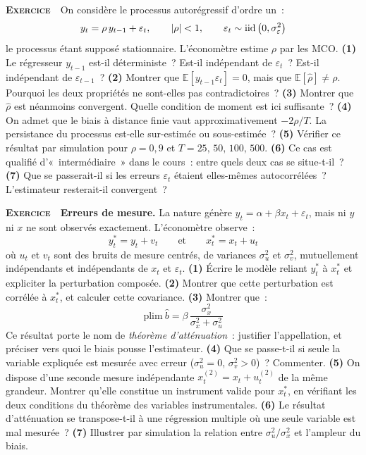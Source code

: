 \documentclass[10pt,a4paper,notitlepage]{article}
\newcounter{xnumber}
\newcommand{\exercice}{\refstepcounter{xnumber}\textsc{\textbf{Exercice}} \textbf{\thexnumber}\,\,}
\newcommand{\question}[1]{\textbf{(#1)}}
\begin{document}
\bigskip

\exercice\label{ex:ar1-biais} On considère le processus autorégressif d'ordre un~:
\[
  y_t = \rho\, y_{t-1} + \varepsilon_t, \qquad |\rho|<1,
  \qquad \varepsilon_t\sim\mathrm{iid}\left(0,\sigma_{\varepsilon}^2\right)
\]
le processus étant supposé stationnaire. L'économètre estime $\rho$ par les MCO.
\question{1} Le régresseur $y_{t-1}$ est-il déterministe~? Est-il indépendant
de $\varepsilon_t$~? Est-il indépendant de $\varepsilon_{t-1}$~? \question{2}
Montrer que $\mathbb E[y_{t-1}\varepsilon_t] = 0$, mais que
$\mathbb E[\hat\rho]\neq\rho$. Pourquoi les deux propriétés ne sont-elles pas
contradictoires~? \question{3} Montrer que $\hat\rho$ est néanmoins convergent.
Quelle condition de moment est ici suffisante~? \question{4} On admet que le
biais à distance finie vaut approximativement $-2\rho/T$. La persistance du
processus est-elle sur-estimée ou sous-estimée~? \question{5} Vérifier ce
résultat par simulation pour $\rho = 0{,}9$ et $T = 25,\,50,\,100,\,500$.
\question{6} Ce cas est qualifié d'«~intermédiaire~» dans le cours~: entre quels
deux cas se situe-t-il~? \question{7} Que se passerait-il si les erreurs
$\varepsilon_t$ étaient elles-mêmes autocorrélées~? L'estimateur resterait-il
convergent~?\newline

\bigskip

\exercice\label{ex:erreurs-mesure} \textbf{Erreurs de mesure.} La nature génère
$y_t = \alpha + \beta x_t + \varepsilon_t$, mais ni $y$ ni $x$ ne sont observés
exactement. L'économètre observe~:
\[
  y_t^{*} = y_t + v_t
  \qquad\text{et}\qquad
  x_t^{*} = x_t + u_t
\]
où $u_t$ et $v_t$ sont des bruits de mesure centrés, de variances $\sigma_u^2$
et $\sigma_v^2$, mutuellement indépendants et indépendants de $x_t$ et
$\varepsilon_t$. \question{1} Écrire le modèle reliant $y_t^{*}$ à $x_t^{*}$ et
expliciter la perturbation composée. \question{2} Montrer que cette perturbation
est corrélée à $x_t^{*}$, et calculer cette covariance. \question{3} Montrer
que~:
\[
  \mathrm{plim}\ \hat b = \beta\,\frac{\sigma_x^2}{\sigma_x^2+\sigma_u^2}
\]
Ce résultat porte le nom de \emph{théorème d'atténuation}~: justifier
l'appellation, et préciser vers quoi le biais pousse l'estimateur. \question{4}
Que se passe-t-il si seule la variable expliquée est mesurée avec erreur
($\sigma_u^2 = 0$, $\sigma_v^2>0$)~? Commenter. \question{5} On dispose d'une
seconde mesure indépendante $x_t^{(2)} = x_t + u_t^{(2)}$ de la même grandeur.
Montrer qu'elle constitue un instrument valide pour $x_t^{*}$, en vérifiant les
deux conditions du théorème des variables instrumentales. \question{6} Le
résultat d'atténuation se transpose-t-il à une régression multiple où une seule
variable est mal mesurée~? \question{7} Illustrer par simulation la relation
entre $\sigma_u^2/\sigma_x^2$ et l'ampleur du biais.\newline
\end{document}
